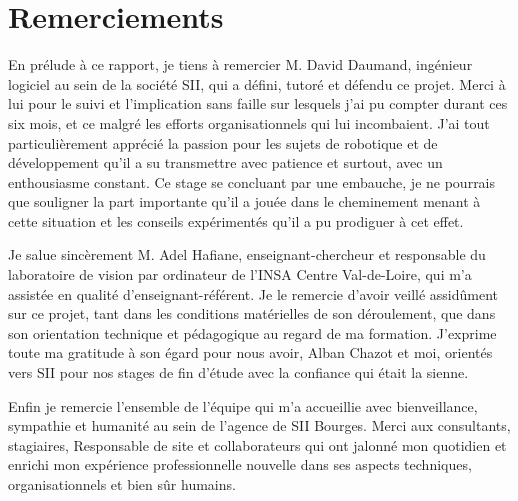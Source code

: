 \chapter*{Remerciements}

En prélude à ce rapport, je tiens à remercier M. David Daumand, ingénieur logiciel au sein de la société \gls{SII}, qui a défini, tutoré et défendu ce projet. 
Merci à lui pour le suivi et l'implication sans faille sur lesquels j'ai pu compter durant ces six mois, et ce malgré les efforts organisationnels qui lui incombaient.
J'ai tout particulièrement apprécié la passion pour les sujets de robotique et de développement qu'il a su transmettre avec patience et surtout, avec un enthousiasme constant.
Ce stage se concluant par une embauche, je ne pourrais que souligner la part importante qu'il a jouée dans le cheminement menant à cette situation et les conseils expérimentés qu'il a pu prodiguer à cet effet. 

Je salue sincèrement M. Adel Hafiane, enseignant-chercheur et responsable du laboratoire de vision par ordinateur de l'INSA Centre Val-de-Loire, qui m'a assistée en qualité d'enseignant-référent.
Je le remercie d'avoir veillé assidûment sur ce projet, tant dans les conditions matérielles de son déroulement, que dans son orientation technique et pédagogique au regard de ma formation. 
J'exprime toute ma gratitude à son égard pour nous avoir, Alban Chazot et moi, orientés vers \gls{SII} pour nos stages de fin d'étude avec la confiance qui était la sienne. 

Enfin je remercie l'ensemble de l'équipe qui m'a accueillie avec bienveillance, sympathie et humanité au sein de l'agence de \gls{SII} Bourges. 
Merci aux consultants, stagiaires, Responsable de site et collaborateurs 
qui ont jalonné mon quotidien et enrichi mon expérience professionnelle nouvelle dans ses aspects techniques, organisationnels et bien sûr humains. 